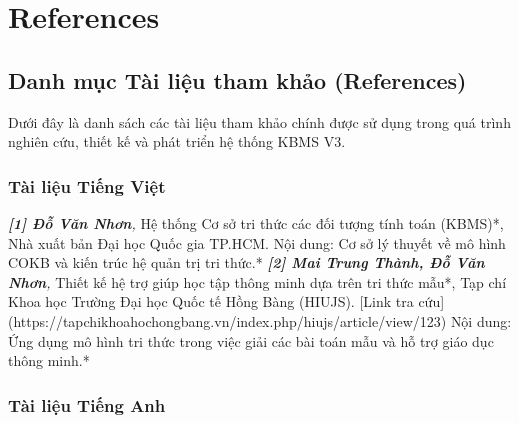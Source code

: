 \chapter{References}
\section{Danh mục Tài liệu tham khảo (References)}

Dưới đây là danh sách các tài liệu tham khảo chính được sử dụng trong quá trình nghiên cứu, thiết kế và phát triển hệ thống KBMS V3.

\subsection{Tài liệu Tiếng Việt}

\textit{   \textbf{[1] Đỗ Văn Nhơn}, }Hệ thống Cơ sở tri thức các đối tượng tính toán (KBMS)*, Nhà xuất bản Đại học Quốc gia TP.HCM. 
    \textit{   }Nội dung: Cơ sở lý thuyết về mô hình COKB và kiến trúc hệ quản trị tri thức.*
\textit{   \textbf{[2] Mai Trung Thành, Đỗ Văn Nhơn}, }Thiết kế hệ trợ giúp học tập thông minh dựa trên tri thức mẫu*, Tạp chí Khoa học Trường Đại học Quốc tế Hồng Bàng (HIUJS). [Link tra cứu](https://tapchikhoahochongbang.vn/index.php/hiujs/article/view/123)
    \textit{   }Nội dung: Ứng dụng mô hình tri thức trong việc giải các bài toán mẫu và hỗ trợ giáo dục thông minh.*

\subsection{Tài liệu Tiếng Anh}

